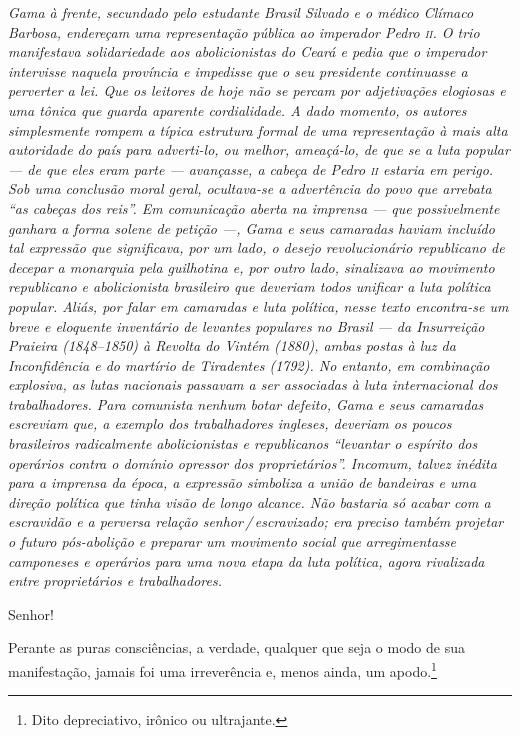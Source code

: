 {\begin{resumo}
\emph{Gama à frente, secundado pelo estudante
Brasil Silvado e o médico Clímaco Barbosa, endereçam uma representação
pública ao imperador Pedro \textsc{ii}. O trio manifestava solidariedade aos
abolicionistas do Ceará e pedia que o imperador intervisse naquela província
e impedisse que o seu presidente continuasse a perverter a lei.
Que os leitores de hoje não se
percam por adjetivações elogiosas e uma tônica que guarda aparente
cordialidade. A dado momento, os autores simplesmente rompem a típica
estrutura formal de uma representação à mais alta autoridade do
país para adverti-lo, ou melhor, ameaçá-lo, de que se a luta popular ---
de que eles eram parte --- avançasse, a cabeça de Pedro \textsc{ii} estaria em
perigo. Sob uma conclusão moral geral, ocultava-se a advertência do povo que arrebata
``as cabeças dos reis''. Em comunicação
aberta na imprensa --- que possivelmente ganhara a forma solene
de petição ---, Gama e seus camaradas haviam incluído tal expressão que
significava, por um lado, o desejo revolucionário republicano de decepar
a monarquia pela guilhotina e, por outro lado, sinalizava ao movimento republicano e
abolicionista brasileiro que deveriam todos unificar a luta política
popular. Aliás, por falar em camaradas e luta política, nesse texto
encontra-se um breve e eloquente inventário de levantes populares no
Brasil --- da Insurreição Praieira (1848--1850) à Revolta do Vintém
(1880), ambas postas à luz da Inconfidência e do martírio de Tiradentes
(1792). No entanto, em combinação explosiva, as lutas nacionais passavam
a ser associadas à luta internacional dos trabalhadores. Para comunista
nenhum botar defeito, Gama e seus camaradas escreviam que, a exemplo dos
trabalhadores ingleses, deveriam os poucos brasileiros radicalmente
abolicionistas e republicanos ``levantar o espírito dos operários contra
o domínio opressor dos proprietários''. Incomum, talvez inédita para a
imprensa da época, a expressão simboliza a união de bandeiras e uma
direção política que tinha visão de longo alcance. Não bastaria só
acabar com a escravidão e a perversa relação senhor\,/\,escravizado; era
preciso também projetar o futuro pós-abolição e preparar um movimento
social que arregimentasse camponeses e operários para uma nova etapa da
luta política, agora rivalizada entre proprietários e trabalhadores. }
\end{resumo}

Senhor!

Perante as puras consciências, a verdade, qualquer que seja o modo de
sua manifestação, jamais foi uma irreverência e, menos ainda, um
apodo.\footnote{Dito depreciativo, irônico ou ultrajante.}

}
